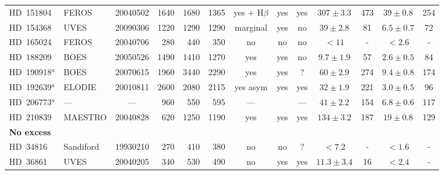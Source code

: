 \documentclass[tradiabstract]{aa} %
\begin{document}
\begin{table*} [h!tb]
\begin{center}
\begin{tabular}{l lc rrr ccc  cccc }
HD~151804  &   \scriptsize{FEROS}    &  \scriptsize{20040502}  & 1640& 1680& 1365   &  \scriptsize{yes + H$\beta$}   & \scriptsize{yes}     & \scriptsize{yes}    & \small{$307 \pm 3.3 $}& 473 & \small{$39 \pm 0.8  $}& 254 \\ 
HD~154368  &   \scriptsize{UVES}     &  \scriptsize{20090306}  & 1220& 1290& 1290    &  \scriptsize{marginal}           & \scriptsize{yes}     & \scriptsize{no}    & \small{$39 \pm 2.8  $}& 81 & \small{$6.5 \pm 0.7  $}& 72 \\ 
HD~165024  &   \scriptsize{FEROS}    &  \scriptsize{20040706}  & 280&  440&  350    & \scriptsize{no}                 & \scriptsize{no}      & \scriptsize{no}     & \small{$<11         $}& - & \small{$<2.6          $}& - \\  
HD~188209  &   \scriptsize{BOES}     &  \scriptsize{20050526}  & 1490& 1410& 1270    & \scriptsize{yes}                & \scriptsize{yes}     & \scriptsize{no}    & \small{$9.7 \pm 1.9 $}& 57 & \small{$2.6 \pm 0.5  $}& 84 \\
HD~190918$^a$&   \scriptsize{BOES}     &  \scriptsize{20070615}  & 1960&  3440& 2290  & \scriptsize{yes}                & \scriptsize{yes}     & \scriptsize{?}   & \small{$60  \pm 2.9 $}& 274 & \small{$9.4 \pm 0.8 $}& 174 \\  
HD~192639$^a$&   \scriptsize{ELODIE}   &  \scriptsize{{ 20010811}}   & 2600& 2080&  2115  &  \scriptsize{\scriptsize{yes} asym} & \scriptsize{yes}    & \scriptsize{yes}   & \small{$32 \pm 1.9   $}& 221 & \small{$3.0 \pm 0.5 $}& 96 \\  
HD~206773$^a$&   ---      &  ---       & 960& 550& 595      & ---                &         & ---  & \small{$41 \pm 2.2  $}& 154 & \small{$6.8 \pm 0.6 $}& 117 \\  
HD~210839  &   \scriptsize{MAESTRO}  &  \scriptsize{20040828}  & 620&  1250& 1190   & \scriptsize{yes}                & \scriptsize{yes}     & \scriptsize{yes}    & \small{$134 \pm 3.2 $}& 187 & \small{$19 \pm 0.8 $}& 129 \\  
          \hline
{\bf No excess} &        &            & &&                   &                &         &       & &    \\
  HD~34816   &  \scriptsize{Sandiford} &  \scriptsize{19930210}  & 270& 410&  380     & \scriptsize{no}                 & \scriptsize{no}      & \scriptsize{?}    &\small{$<7.2         $}& - & \small{$<1.6 $}& - \\
HD~36861   &  \scriptsize{UVES}      &  \scriptsize{20040205}  &340& 530& 490      & \scriptsize{no}                 & \scriptsize{yes}     & \scriptsize{yes}     &\small{$11.3 \pm 3.4 $}& 16 & \small{$ <2.4$}& - \\

\end{tabular}
\end{center}
\end{table*}
\end{document}
